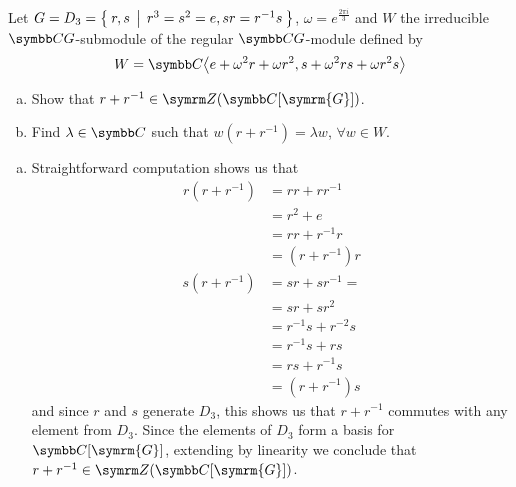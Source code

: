 \begin{exercise}
Let \(G = D_3 = \Set{ r, s \, | \,r^3 = s^2 = e, sr = r^{-1} s }\), \(\omega = e^{\frac{2 \pi i}{3}}\) and \(W\) the irreducible \(\complex G\)-submodule of the regular \(\complex G\)-module defined by
\[
    W = \complex{\generatedby{e + \omega^2 r + \omega r^2, s + \omega^2 r s + \omega r^2 s}}
\]
\begin{enumerate}[(a)]
    \item Show that \(r + r^{-1} \in \centerofgroup(\complex[\symrm{G}])\).
    \item Find \(\lambda \in \complex\) such that \(w (r + r^{-1}) = \lambda w\), \(\forall w \in W\).
\end{enumerate}
\end{exercise}
\begin{solution}
\begin{enumerate}[(a)]
    \item Straightforward computation shows us that
    \begin{align*}
        r (r + r^{-1}) &= rr + r r^{-1} \\
        &= r^2 + e \\
        &= r r + r^{-1} r \\
        &= (r + r^{-1}) r
    \end{align*}
    \begin{align*}
        s (r + r^{-1}) &= s r + s r^{-1} = \\
        &= s r + s r^2 \\
        &= r^{-1} s + r^{-2} s \\
        &= r^{-1} s + r s \\
        &= r s + r^{-1} s \\
        &= (r + r^{-1}) s
    \end{align*}
    and since \(r\) and \(s\) generate \(D_3\), this shows us that \(r + r^{-1}\) commutes with any element from \(D_3\). Since the elements of \(D_3\) form a basis for \(\complex[\symrm{G}]\), extending by linearity we conclude that \(r + r^{-1} \in \centerofgroup(\complex[\symrm{G}])\).
    

\end{enumerate}
\end{solution}
